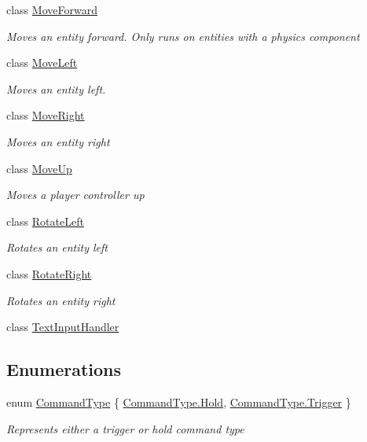 \begin{DoxyCompactItemize}
class \hyperlink{class_m_b2_d_1_1_i_o_1_1_move_forward}{Move\+Forward}
\begin{DoxyCompactList}\small\item\em Moves an entity forward. Only runs on entities with a physics component \end{DoxyCompactList}\item 
class \hyperlink{class_m_b2_d_1_1_i_o_1_1_move_left}{Move\+Left}
\begin{DoxyCompactList}\small\item\em Moves an entity left. \end{DoxyCompactList}\item 
class \hyperlink{class_m_b2_d_1_1_i_o_1_1_move_right}{Move\+Right}
\begin{DoxyCompactList}\small\item\em Moves an entity right \end{DoxyCompactList}\item 
class \hyperlink{class_m_b2_d_1_1_i_o_1_1_move_up}{Move\+Up}
\begin{DoxyCompactList}\small\item\em Moves a player controller up \end{DoxyCompactList}\item 
class \hyperlink{class_m_b2_d_1_1_i_o_1_1_rotate_left}{Rotate\+Left}
\begin{DoxyCompactList}\small\item\em Rotates an entity left \end{DoxyCompactList}\item 
class \hyperlink{class_m_b2_d_1_1_i_o_1_1_rotate_right}{Rotate\+Right}
\begin{DoxyCompactList}\small\item\em Rotates an entity right \end{DoxyCompactList}\item 
class \hyperlink{class_m_b2_d_1_1_i_o_1_1_text_input_handler}{Text\+Input\+Handler}
\end{DoxyCompactItemize}
\subsection*{Enumerations}
\begin{DoxyCompactItemize}
\item 
enum \hyperlink{namespace_m_b2_d_1_1_i_o_ab5f95f3fe9e652778b62bdf943168a68}{Command\+Type} \{ \hyperlink{namespace_m_b2_d_1_1_i_o_ab5f95f3fe9e652778b62bdf943168a68abcd8db575b47c838e5d551e3973db4ac}{Command\+Type.\+Hold}, 
\hyperlink{namespace_m_b2_d_1_1_i_o_ab5f95f3fe9e652778b62bdf943168a68af698f67f5666aff10729d8a1cb1c14d2}{Command\+Type.\+Trigger}
 \}\begin{DoxyCompactList}\small\item\em Represents either a trigger or hold command type \end{DoxyCompactList}
\end{DoxyCompactItemize}



